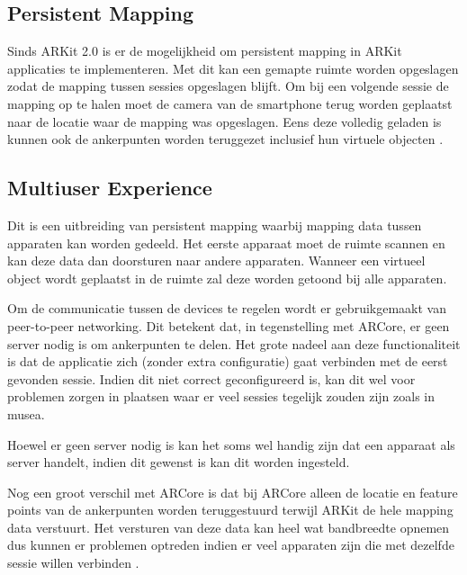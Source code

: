 \subsection{Persistent Mapping}
Sinds ARKit 2.0 is er de mogelijkheid om persistent mapping in ARKit applicaties te implementeren. Met dit kan een gemapte ruimte worden opgeslagen zodat de mapping tussen sessies opgeslagen blijft.
Om bij een volgende sessie de mapping op te halen moet de camera van de smartphone terug worden geplaatst naar de locatie waar de mapping was opgeslagen. Eens deze volledig geladen is kunnen ook de ankerpunten worden teruggezet inclusief hun virtuele objecten \autocite{ARKitPersistent}.

\subsection{Multiuser Experience}
Dit is een uitbreiding van persistent mapping waarbij mapping data tussen apparaten kan worden gedeeld. Het eerste apparaat moet de ruimte scannen en kan deze data dan doorsturen naar andere apparaten. Wanneer een virtueel object wordt geplaatst in de ruimte zal deze worden getoond bij alle apparaten.

Om de communicatie tussen de devices te regelen wordt er gebruikgemaakt van peer-to-peer networking. Dit betekent dat, in tegenstelling met ARCore, er geen server nodig is om ankerpunten te delen. Het grote nadeel aan deze functionaliteit is dat de applicatie zich (zonder extra configuratie) gaat verbinden met de eerst gevonden sessie. Indien dit niet correct geconfigureerd is, kan dit wel voor problemen zorgen in plaatsen waar er veel sessies tegelijk zouden zijn zoals in musea.

Hoewel er geen server nodig is kan het soms wel handig zijn dat een apparaat als server handelt, indien dit gewenst is kan dit worden ingesteld.

Nog een groot verschil met ARCore is dat bij ARCore alleen de locatie en feature points van de ankerpunten worden teruggestuurd terwijl ARKit de hele mapping data verstuurt. Het versturen van deze data kan heel wat bandbreedte opnemen dus kunnen er problemen optreden indien er veel apparaten zijn die met dezelfde sessie willen verbinden \autocite{ARKitMultiuser}.

